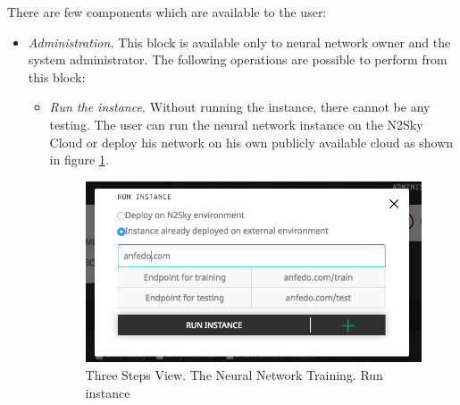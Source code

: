 There are few components which are available to the user:
\begin{itemize}
\item \emph{Administration.} This block is available only to neural network owner and the system administrator. The following operations are possible to perform from this block:
\begin{itemize}
\item \emph{Run the instance.} Without running the instance, there cannot be any testing. The user can run the neural network instance on the N2Sky Cloud or deploy his network on his own publicly available cloud as shown in figure \ref{fig:run_instance_3_steps}. 

\begin{figure}[H]
\begin{center}
  \includegraphics[scale=0.5]{components/5/img/run_instance_3_steps.png}
  \caption{Three Steps View. The Neural Network Training. Run instance}
  \label{fig:run_instance_3_steps}
\end{center}
\end{figure}


\end{itemize}
\end{itemize}
